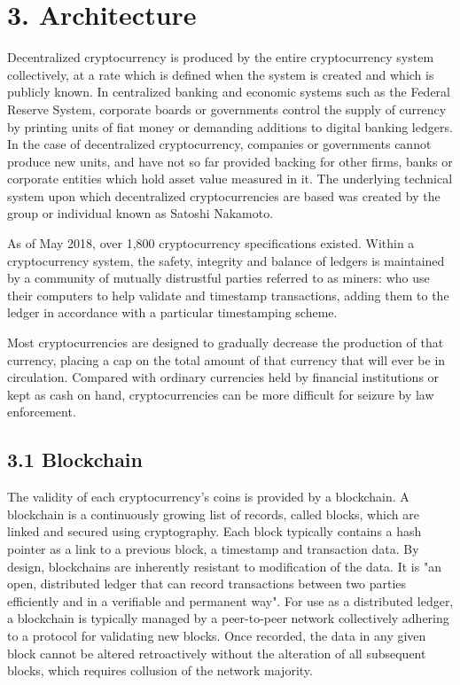 \pagebreak 
\section*{3. Architecture}

Decentralized cryptocurrency is produced by the entire cryptocurrency system collectively, at a rate which is defined when the system is created and which is publicly known. In centralized banking and economic systems such as the Federal Reserve System, corporate boards or governments control the supply of currency by printing units of fiat money or demanding additions to digital banking ledgers. In the case of decentralized cryptocurrency, companies or governments cannot produce new units, and have not so far provided backing for other firms, banks or corporate entities which hold asset value measured in it. The underlying technical system upon which decentralized cryptocurrencies are based was created by the group or individual known as Satoshi Nakamoto.\vspace{.3cm}

As of May 2018, over 1,800 cryptocurrency specifications existed. Within a cryptocurrency system, the safety, integrity and balance of ledgers is maintained by a community of mutually distrustful parties referred to as miners: who use their computers to help validate and timestamp transactions, adding them to the ledger in accordance with a particular timestamping scheme.\vspace{.3cm}

Most cryptocurrencies are designed to gradually decrease the production of that currency, placing a cap on the total amount of that currency that will ever be in circulation. Compared with ordinary currencies held by financial institutions or kept as cash on hand, cryptocurrencies can be more difficult for seizure by law enforcement.\vspace{.3cm}

\subsection*{3.1 Blockchain}
The validity of each cryptocurrency's coins is provided by a blockchain. A blockchain is a continuously growing list of records, called blocks, which are linked and secured using cryptography. Each block typically contains a hash pointer as a link to a previous block, a timestamp and transaction data. By design, blockchains are inherently resistant to modification of the data. It is "an open, distributed ledger that can record transactions between two parties efficiently and in a verifiable and permanent way". For use as a distributed ledger, a blockchain is typically managed by a peer-to-peer network collectively adhering to a protocol for validating new blocks. Once recorded, the data in any given block cannot be altered retroactively without the alteration of all subsequent blocks, which requires collusion of the network majority.\vspace{.3cm}

